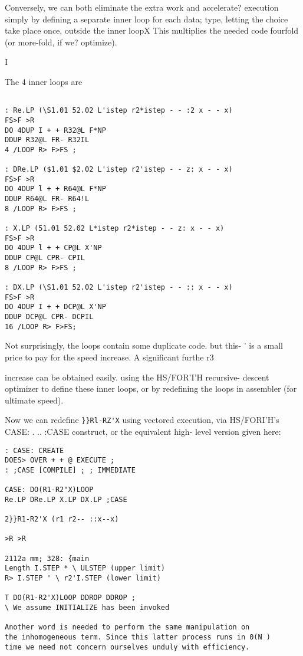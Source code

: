 {{{{{{{{{Conversely, we can both eliminate the extra work and accelerate?
execution simply by defining a separate inner loop for each data;
type, letting the choice take place once, outside the inner loopX
This multiplies the needed code fourfold (or more-fold, if we?
optimize).

I

The 4 inner loops are
\begin{verbatim}

: Re.LP (\S1.01 52.02 L'istep r2*istep - - :2 x - - x)
FS>F >R
DO 4DUP I + + R32@L F*NP
DDUP R32@L FR- R32IL
4 /LOOP R> F>FS ;

: DRe.LP ($1.01 $2.02 L'istep r2'istep - - z: x - - x)
FS>F >R
DO 4DUP l + + R64@L F*NP
DDUP R64@L FR- R64!L
8 /LOOP R> F>FS ;

: X.LP (51.01 52.02 L*istep r2*istep - - z: x - - x)
FS>F >R
DO 4DUP l + + CP@L X'NP
DDUP CP@L CPR- CPIL
8 /LOOP R> F>FS ;

: DX.LP (\S1.01 52.02 L'istep r2'istep - - :: x - - x)
FS>F >R
DO 4DUP I + + DCP@L X'NP
DDUP DCP@L CPR- DCPIL
16 /LOOP R> F>FS;
\end{verbatim} 

Not surprisingly, the loops contain some duplicate code. but this- '
is a small price to pay for the speed increase. A significant furthe r3

 


increase can be obtained easily. using the HS/FOR'I'H recursive-
descent optimizer to define these inner loops, or by redefining
the loops in assembler (for ultimate speed).

Now we can redefine \verb|}}Rl-RZ'X| using vectored execution, via
HS/FORI'H's CASE: . .. :CASE construct, or the equivalent high-
level version given here:

\begin{verbatim}
: CASE: CREATE
DOES> OVER + + @ EXECUTE ;
: ;CASE [COMPILE] ; ; IMMEDIATE

CASE: DO(R1-R2"X)LOOP
Re.LP DRe.LP X.LP DX.LP ;CASE

2}}R1-R2'X (r1 r2-- ::x--x)

>R >R

2112a mm; 328: {main
Length I.STEP * \ ULSTEP (upper limit)
R> I.STEP ' \ r2'I.STEP (lower limit)

T DO(R1-R2'X)LOOP DDROP DDROP ;
\ We assume INITIALIZE has been invoked

Another word is needed to perform the same manipulation on
the inhomogeneous term. Since this latter process runs in 0(N )
time we need not concern ourselves unduly with efficiency.


\end{verbatim}}}}}}}}}}

